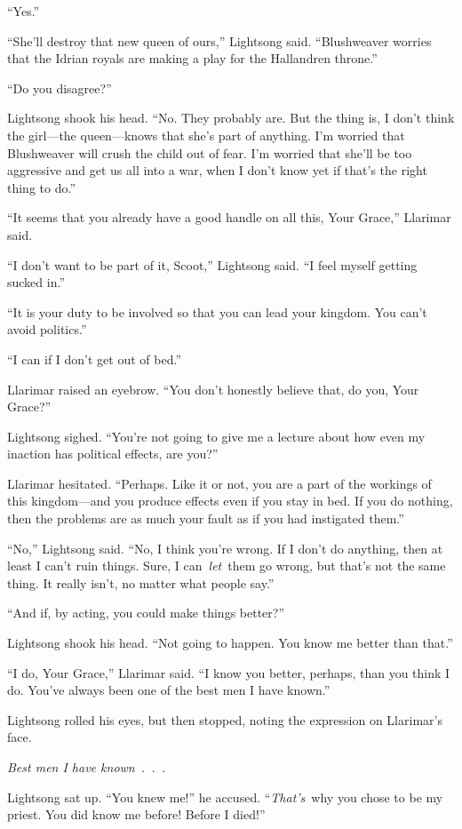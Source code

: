 “Yes.”

“She’ll destroy that new queen of ours,” Lightsong said. “Blushweaver worries that the Idrian royals are making a play for the Hallandren throne.”

“Do you disagree?”

Lightsong shook his head. “No. They probably are. But the thing is, I don’t think the girl—the queen—knows that she’s part of anything. I’m worried that Blushweaver will crush the child out of fear. I’m worried that she’ll be too aggressive and get us all into a war, when I don’t know yet if that’s the right thing to do.”

“It seems that you already have a good handle on all this, Your Grace,” Llarimar said.

“I don’t want to be part of it, Scoot,” Lightsong said. “I feel myself getting sucked in.”

“It is your duty to be involved so that you can lead your kingdom. You can’t avoid politics.”

“I can if I don’t get out of bed.”

Llarimar raised an eyebrow. “You don’t honestly believe that, do you, Your Grace?”

Lightsong sighed. “You’re not going to give me a lecture about how even my inaction has political effects, are you?”

Llarimar hesitated. “Perhaps. Like it or not, you are a part of the workings of this kingdom—and you produce effects even if you stay in bed. If you do nothing, then the problems are as much your fault as if you had instigated them.”

“No,” Lightsong said. “No, I think you’re wrong. If I don’t do anything, then at least I can’t ruin things. Sure, I can~\textit{let}~them go wrong, but that’s not the same thing. It really isn’t, no matter what people say.”

“And if, by acting, you could make things better?”

Lightsong shook his head. “Not going to happen. You know me better than that.”

“I do, Your Grace,” Llarimar said. “I know you better, perhaps, than you think I do. You’ve always been one of the best men I have known.”

Lightsong rolled his eyes, but then stopped, noting the expression on Llarimar’s face.

\textit{Best men I have known~.~.~.}

Lightsong sat up. “You knew me!” he accused. “\textit{That’s}~why you chose to be my priest. You did know me before! Before I died!”

